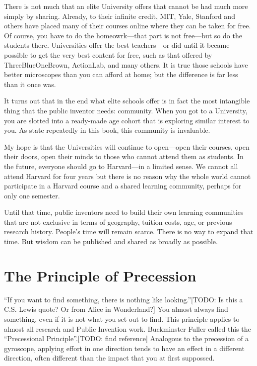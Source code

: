 \documentclass[
	fontsize=10pt, %
	twoside=false, %
	secnumdepth=1, %
]{kaobook}
\begin{document}
There is not much that an elite University offers that cannot be had much
more simply by sharing.
Already, to their infinite credit, MIT, Yale, Stanford and others have placed many
of their courses online where they can be taken for free. Of course, you have to do
the homeowrk---that part is not free---but so do the students there.
Universities offer the best teachers---or did until it became possible to get the
very best content for free, such as that offered by ThreeBlueOneBrown, ActionLab,
and many others.
It is true those schools have better microscopes than you can afford at home;
but the difference is far less than it once was.

It turns out that in the end what elite schools offer is in fact the most
intangible thing that the public inventor needs: community.
When you got to a University, you are slotted into a ready-made age cohort
that is exploring similar interest to you.
As state repeatedly in this book, this community is invaluable.

My hope is that the Universities will continue to open---open their courses,
open their doors, open their minds to those who cannot attend them as students.
In the future, everyone should go to Harvard---in a limited sense.
We cannot all attend Harvard for four years but there is no reason why the
whole world cannot participate in a Harvard course and a shared learning community,
perhaps for only one semester.

Until that time, public inventors need to build their own learning communities that
are not exclusive in terms of geography, tuition costs, age, or previous research history.
People's time will remain scarce. There is no way to expand that time. But wisdom
can be published and shared as broadly as possible.


\section{The Principle of Precession}

``If you want to find something, there is nothing like looking.''[TODO: Is this a C.S. Lewis quote? Or from Alice in Wonderland?]
You almost always find something, even if it is not what you set out to find.
This principle applies to almost all research and Public Invention work.
Buckminster Fuller called this the ``Precessional Principle''.[TODO: find reference]
Analogous to the precession of a gyroscope, applying effort in
one direction tends to have an effect in a different direction,
often different than the impact that you at first suppossed.
\end{document}
